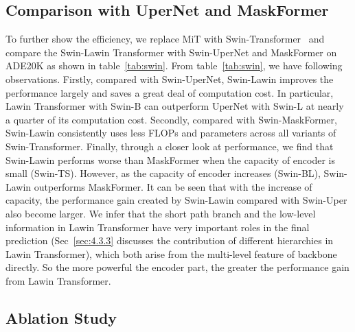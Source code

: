 \documentclass[10pt,twocolumn,letterpaper]{article}
\begin{document}
\subsection{Comparison with UperNet and MaskFormer}
To further show the efficiency, we replace MiT with Swin-Transformer~\cite{liu2021swin} and compare the Swin-Lawin Transformer with Swin-UperNet and MaskFormer on ADE20K as shown in table~\ref{tab:swin}. From table~\ref{tab:swin}, we have following observations. Firstly, compared with Swin-UperNet, Swin-Lawin improves the performance largely and saves a great deal of computation cost. In particular, Lawin Transformer with Swin-B can outperform UperNet with Swin-L at nearly a quarter of its computation cost. Secondly, compared with Swin-MaskFormer, Swin-Lawin consistently uses less FLOPs and parameters across all variants of Swin-Transformer. Finally, through a closer look at performance, we find that Swin-Lawin performs worse than MaskFormer when the capacity of encoder is small (Swin-TS). However, as the capacity of encoder increases (Swin-BL), Swin-Lawin outperforms MaskFormer. It can be seen that with the increase of capacity, the performance gain created by Swin-Lawin compared with Swin-Uper also become larger. We infer that the short path branch and the low-level information in Lawin Transformer have very important roles in the final prediction (Sec~\ref{sec:4.3.3} discusses the contribution of different hierarchies in Lawin Transformer), which both arise from the multi-level feature of backbone directly. So the more powerful the encoder part, the greater the performance gain from Lawin Transformer.



\subsection{Ablation Study}
\end{document}
